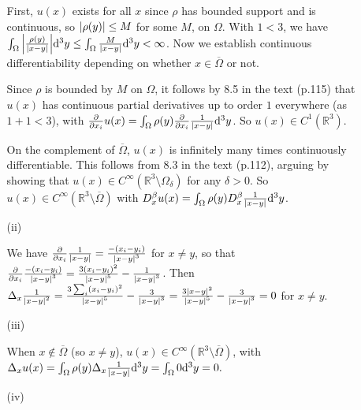 \documentclass[11pt]{article}
\begin{document}
\begin{enumerate}
\begin{enumerate}
        First, $u(x)$ exists for all $x$ since $\rho$ has bounded support and is continuous, so $\abs{\rho(y)}\leq M$ for some $M$, on $\Omega$. With $1<3$, we have $\int_\Omega\abs{\frac{\rho(y)}{\abs{x-y}}}\dd^3y\leq \int_\Omega \frac{M}{\abs{x-y}}\dd^3y<\infty$. Now we establish continuous differentiability depending on whether $x\in\overline \Omega$ or not.

        Since $\rho$ is bounded by $M$ on $\Omega$, it follows by 8.5 in the text (p.115) that $u(x)$ has continuous partial derivatives up to order $1$ everywhere (as $1+1<3$), with $\pdv{x_i} u(x) = \int_\Omega \rho(y)\pdv{x_i}\frac{1}{\abs{x-y}}\dd^3y$. So $u(x)\in C^1(\mathbb R^3)$.

        On the complement of $\overline \Omega$, $u(x)$ is infinitely many times continuously differentiable. This follows from 8.3 in the text (p.112), arguing by showing that $u(x)\in C^\infty(\mathbb R^3\setminus \Omega_\delta)$ for any $\delta>0$. So $u(x)\in C^\infty(\mathbb R^3\setminus \overline{\Omega})$ with $D^\beta_xu(x) = \int_\Omega \rho(y)D^\beta_x\frac{1}{\abs{x-y}}\dd^3y$.
        
        \item[(ii)] %
        
        We have $\pdv{x_i}\frac{1}{\abs{x-y}} = \frac{-(x_i-y_i)}{\abs{x-y}^3}$ for $x\neq y$, so that $\pdv{x_i}\frac{-(x_i-y_i)}{\abs{x-y}^3} = \frac{3(x_i-y_i)^2}{\abs{x-y}^5} - \frac{1}{\abs{x-y}^3}$. Then $\Delta_x \frac{1}{\abs{x-y}^2} = \frac{3\sum_i(x_i-y_i)^2}{\abs{x-y}^5} - \frac{3}{\abs{x-y}^3} = \frac{3\abs{x-y}^2}{\abs{x-y}^5} - \frac{3}{\abs{x-y}^3} = 0$ for $x\neq y$.
        \item[(iii)] %
        
        When $x\not\in\overline\Omega$ (so $x\neq y$), $u(x)\in C^\infty(\mathbb R^3\setminus \overline \Omega)$, with $\Delta_xu(x) = \int_\Omega \rho(y)\Delta_x\frac{1}{\abs{x-y}}\dd^3y = \int_\Omega 0\dd^3y = 0.$
        
        \item[(iv)] %
        

\end{enumerate}
\end{enumerate}
\end{document}
